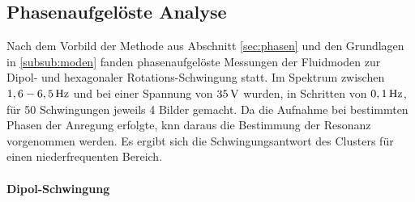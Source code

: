       \subsection{Phasenaufgelöste Analyse}\label{subsec:phasenanal}

        Nach dem Vorbild der Methode aus Abschnitt \ref{sec:phasen} und den Grundlagen in \ref{subsub:moden} fanden phasenaufgelöste Messungen der Fluidmoden zur Dipol- und hexagonaler Rotations-Schwingung statt. Im Spektrum zwischen $\unit[1,6-6,5]{Hz}$ und bei einer Spannung von $\unit[35]{V}$  wurden, in Schritten von $\unit[0,1]{Hz}$, für 50 Schwingungen jeweils 4 Bilder gemacht. Da die Aufnahme bei bestimmten Phasen der Anregung erfolgte, knn daraus die Bestimmung der Resonanz vorgenommen werden. Es ergibt sich die Schwingungsantwort des Clusters für einen niederfrequenten Bereich.

        \paragraph{Dipol-Schwingung}
        
